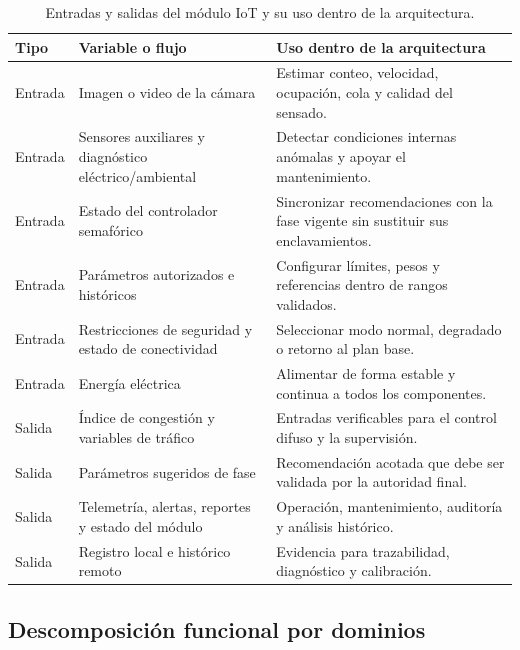 \begin{table}[H]
  \centering
  \footnotesize
  \caption{Entradas y salidas del módulo IoT y su uso dentro de la arquitectura.}
  \label{tab:entradas-salidas}
  \begin{tabularx}{\linewidth}{@{}>{\raggedright\arraybackslash}p{1.7cm}>{\raggedright\arraybackslash}p{5.0cm}>{\raggedright\arraybackslash}X@{}}
    \toprule
    \textbf{Tipo} & \textbf{Variable o flujo} & \textbf{Uso dentro de la arquitectura}\\
    \midrule
    Entrada & Imagen o video de la cámara & Estimar conteo, velocidad, ocupación, cola y calidad del sensado.\\
    Entrada & Sensores auxiliares y diagnóstico eléctrico/ambiental & Detectar condiciones internas anómalas y apoyar el mantenimiento.\\
    Entrada & Estado del controlador semafórico & Sincronizar recomendaciones con la fase vigente sin sustituir sus enclavamientos.\\
    Entrada & Parámetros autorizados e históricos & Configurar límites, pesos y referencias dentro de rangos validados.\\
    Entrada & Restricciones de seguridad y estado de conectividad & Seleccionar modo normal, degradado o retorno al plan base.\\
    Entrada & Energía eléctrica & Alimentar de forma estable y continua a todos los componentes.\\
    Salida & Índice de congestión y variables de tráfico & Entradas verificables para el control difuso y la supervisión.\\
    Salida & Parámetros sugeridos de fase & Recomendación acotada que debe ser validada por la autoridad final.\\
    Salida & Telemetría, alertas, reportes y estado del módulo & Operación, mantenimiento, auditoría y análisis histórico.\\
    Salida & Registro local e histórico remoto & Evidencia para trazabilidad, diagnóstico y calibración.\\
    \bottomrule
  \end{tabularx}
\end{table}

\subsection{Descomposición funcional por dominios}\label{sec:dominios-funcionales}

